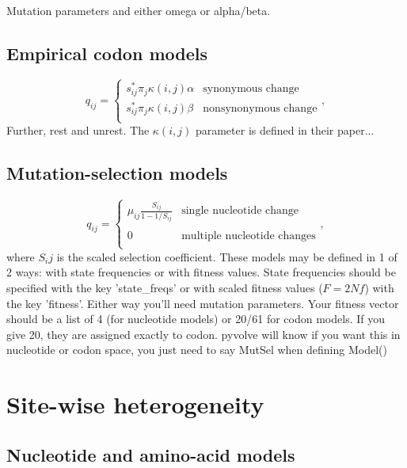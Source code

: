 \documentclass{article}
\begin{document}
Mutation parameters and either omega or alpha/beta.

\subsection{Empirical codon models}

\begin{equation}\label{eq:ecmrest}
q_{ij} = \left\{ 
\begin{array}{rl}
s^\ast_{ij} \pi_j \kappa(i,j) \alpha      &\text{synonymous change} \\
s^\ast_{ij} \pi_j \kappa(i,j) \beta       &\text{nonsynonymous change} \\
\end{array} \right.,
\end{equation}
Further, rest and unrest. The $\kappa(i,j)$ parameter is defined in their paper...


\subsection{Mutation-selection models}
\begin{equation}
q_{ij} = \left\{ 
\begin{array}{rl}
	\mu_{ij} \frac{S_{ij}}{1-1/S_{ij}} &\text{single nucleotide change} \\\\
	0                                  &\text{multiple nucleotide changes} \\             
\end{array} \right.,
\end{equation} where $S_ij$ is the scaled selection coefficient. These models may be defined in 1 of 2 ways: with state frequencies or with fitness values. State frequencies should be specified with the key 'state\_freqs' or with scaled fitness values ($F = 2Nf$) with the key 'fitness'. Either way you'll need mutation parameters.
Your fitness vector should be a list of 4 (for nucleotide models) or 20/61 for codon models. If you give 20, they are assigned exactly to codon.
pyvolve will know if you want this in nucleotide or codon space, you just need to say MutSel when defining Model()


\section{Site-wise heterogeneity}
\subsection{Nucleotide and amino-acid models}
\end{document}
